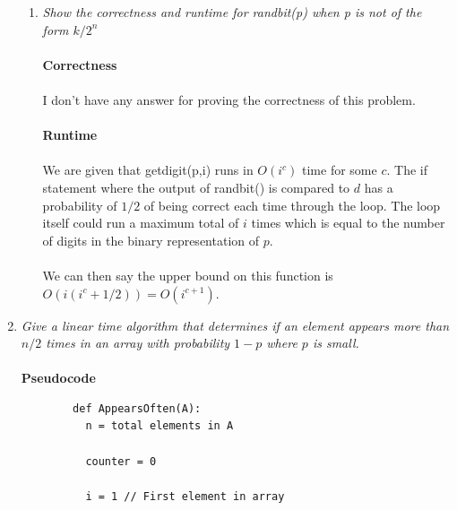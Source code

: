 \documentclass[12pt]{article}
\begin{document}
\begin{enumerate}
\begin{enumerate}
			\item \textit{Show the correctness and runtime for randbit(p) when p is not of the form $k/2^n$}\\
			\\
			\textbf{Correctness}\\
			\\
			I don't have any answer for proving the correctness of this problem.\\
			\\
			\textbf{Runtime}\\
			\\	
			We are given that getdigit(p,i) runs in $O(i^c)$ time for some $c$.  
			The if statement where the output of randbit() is compared to $d$ has a probability of $1/2$ of being correct
			each time through the loop.  The loop itself could run a maximum total of $i$ times 
			which is equal to the number of digits in the binary representation of $p$.\\
			\\
			We can then say the upper bound on this function is $O(i (i^c + 1/2)) = O(i^{c+1})$.
		\end{enumerate}

    \newpage
		\item \textit{Give a linear time algorithm that determines if an 
		element appears more than $n/2$ times in an array with probability $1-p$ where $p$ is small.}\\
		\\
		\textbf{Pseudocode}
		\begin{verbatim}
		def AppearsOften(A):
		  n = total elements in A

		  counter = 0

		  i = 1 // First element in array
      

\end{verbatim}
\end{enumerate}
\end{document}
